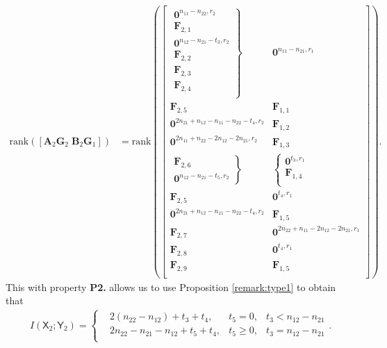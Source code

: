 \documentclass[12pt, draftclsnofoot, onecolumn]{IEEEtran}
\newcommand{\msf}[1]{\mathsf{#1}}
\theoremstyle{definition}
\begin{document}
\begin{align}\label{eq:type2_example2}
\text{rank}([\boldsymbol{A}_2\boldsymbol{G}_2 \; \boldsymbol{B}_2\boldsymbol{G}_1]) &=
\text{rank}\left(
\begin{bmatrix}
\left. {\begin{array}{*{20}{c}}
\boldsymbol{0}^{n_{11}-n_{22},r_2} \\
\boldsymbol{F}_{2,1} \\
\boldsymbol{0}^{n_{12}-n_{21}-t_3,r_2} \\
\boldsymbol{F}_{2,2} \\
\boldsymbol{F}_{2,3} \\
\boldsymbol{F}_{2,4} \\
\end{array}} \right\} & \boldsymbol{0}^{n_{11}-n_{21},r_1} \\
\boldsymbol{F}_{2,5} & \boldsymbol{F}_{1,1}\\
\boldsymbol{0}^{2n_{21}+n_{12}-n_{11}-n_{22}-t_4,r_2} & \boldsymbol{F}_{1,2}\\
\boldsymbol{0}^{2n_{11}+n_{22}-2n_{12}-2n_{21},r_2} & \boldsymbol{F}_{1,3}\\
\left. {\begin{array}{*{20}{c}}
\boldsymbol{F}_{2,6} \\
\boldsymbol{0}^{n_{12}-n_{21}-t_5,r_2}
\end{array}} \right\} &\left\{ {\begin{array}{*{20}{c}}
\boldsymbol{0}^{t_3,r_1}\\
\boldsymbol{F}_{1,4}\\
\end{array}} \right.\\
\boldsymbol{F}_{2,5} & \boldsymbol{0}^{t_4,r_1}\\
\boldsymbol{0}^{2n_{21}+n_{12}-n_{11}-n_{22}-t_4,r_2} & \boldsymbol{F}_{1,5} \\
\boldsymbol{F}_{2,7} &\boldsymbol{0}^{2n_{22}+n_{11}-2n_{12}-2n_{21},r_1}\\
\boldsymbol{F}_{2,8} &\boldsymbol{0}^{t_4,r_1}\\
\boldsymbol{F}_{2,9} &\boldsymbol{F}_{1,5} \\
\end{bmatrix}
\right).
\end{align}
This with property \textbf{P2.} allows us to use Proposition \ref{remark:type1} to obtain that
\begin{align}
I(\msf{X}_2;\msf{Y}_2)= \left\{ {\begin{array}{*{20}{c}}
&2(n_{22}-n_{12})+t_3+t_4,&t_5 = 0,&t_3<n_{12}-n_{21}\\
&2n_{22}-n_{21}-n_{12}+t_5+t_4,&t_5\geq0, &t_3=n_{12}-n_{21}\\
\end{array}} \right..
\end{align}
\end{document}
